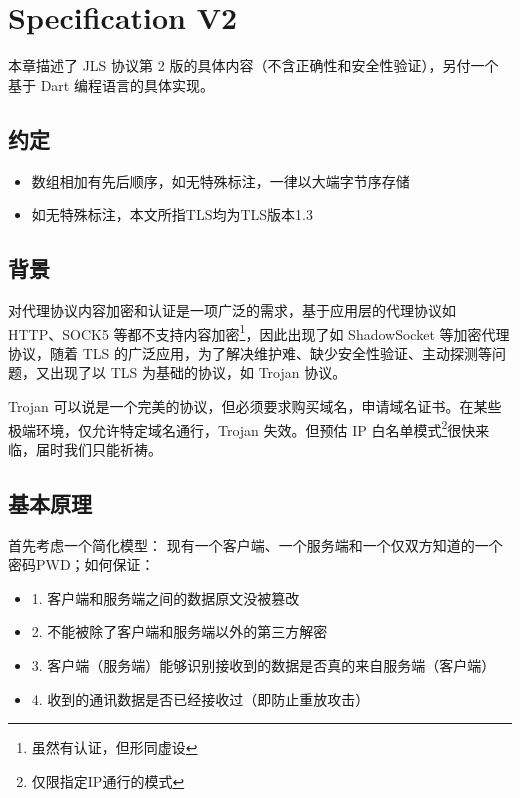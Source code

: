 
\chapter{Specification V2}
本章描述了 JLS 协议第 2 版的具体内容（不含正确性和安全性验证），另付一个基于 Dart 编程语言的具体实现。

\section{约定}
\begin{itemize}
	\item 数组相加有先后顺序，如无特殊标注，一律以大端字节序存储
	\item 如无特殊标注，本文所指TLS均为TLS版本1.3\cite{rescorla2018transport}
\end{itemize}

\section{背景}

对代理协议内容加密和认证是一项广泛的需求，基于应用层的代理协议如 HTTP、SOCK5 等都不支持内容加密\footnote{虽然有认证，但形同虚设}，因此出现了如 ShadowSocket 等加密代理协议，随着 TLS 的广泛应用，为了解决维护难、缺少安全性验证、主动探测等问题，又出现了以 TLS 为基础的协议，如 Trojan 协议。

Trojan 可以说是一个完美的协议，但必须要求购买域名，申请域名证书。在某些极端环境，仅允许特定域名通行，Trojan 失效。但预估 IP 白名单模式\footnote{仅限指定IP通行的模式}很快来临，届时我们只能祈祷。


\section{基本原理}

首先考虑一个简化模型：
现有一个客户端、一个服务端和一个仅双方知道的一个密码PWD；如何保证：\newline
\begin{itemize}
	\item 1. 客户端和服务端之间的数据原文没被篡改
	\item 2. 不能被除了客户端和服务端以外的第三方解密
	\item 3. 客户端（服务端）能够识别接收到的数据是否真的来自服务端（客户端）
	\item 4. 收到的通讯数据是否已经接收过（即防止重放攻击）\newline
\end{itemize}

